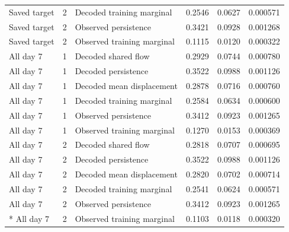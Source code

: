 \documentclass[10pt,a4paper]{article}
\begin{document}
{{\begin{longtable}{@{}p{26mm}p{9mm}p{53mm}p{24mm}p{25mm}p{28mm}@{}}
Saved target & 2 & Decoded training marginal & 0.2546 & 0.0627 & 0.000571 \\
Saved target & 2 & Observed persistence & 0.3421 & 0.0928 & 0.001268 \\
Saved target & 2 & Observed training marginal & 0.1115 & 0.0120 & 0.000322 \\
All day 7 & 1 & Decoded shared flow & 0.2929 & 0.0744 & 0.000780 \\
All day 7 & 1 & Decoded persistence & 0.3522 & 0.0988 & 0.001126 \\
All day 7 & 1 & Decoded mean displacement & 0.2878 & 0.0716 & 0.000760 \\
All day 7 & 1 & Decoded training marginal & 0.2584 & 0.0634 & 0.000600 \\
All day 7 & 1 & Observed persistence & 0.3412 & 0.0923 & 0.001265 \\
All day 7 & 1 & Observed training marginal & 0.1270 & 0.0153 & 0.000369 \\
All day 7 & 2 & Decoded shared flow & 0.2818 & 0.0707 & 0.000695 \\
All day 7 & 2 & Decoded persistence & 0.3522 & 0.0988 & 0.001126 \\
All day 7 & 2 & Decoded mean displacement & 0.2820 & 0.0702 & 0.000714 \\
All day 7 & 2 & Decoded training marginal & 0.2541 & 0.0624 & 0.000571 \\
All day 7 & 2 & Observed persistence & 0.3412 & 0.0923 & 0.001265 \\*
All day 7 & 2 & Observed training marginal & 0.1103 & 0.0118 & 0.000320 \\
\end{longtable}
}

}
\end{document}

